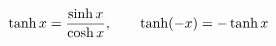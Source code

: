 \documentclass[preview]{standalone}
\begin{document}
\begin{align*}
\special{dvisvgm:raw <g id='unique000'>}\tanh x=\frac{\sinh x}{\cosh x},\qquad\tanh(-x)=-\tanh x\special{dvisvgm:raw </g>}
\end{align*}
\end{document}

